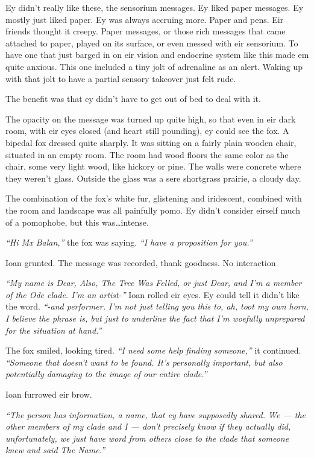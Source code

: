 Ey didn't really like these, the sensorium messages. Ey liked paper messages. Ey mostly just liked paper. Ey was always accruing more. Paper and pens. Eir friends thought it creepy. Paper messages, or those rich messages that came attached to paper, played on its surface, or even messed with eir sensorium. To have one that just barged in on eir vision and endocrine system like this made em quite anxious. This one included a tiny jolt of adrenaline as an alert. Waking up with that jolt to have a partial sensory takeover just felt rude.

The benefit was that ey didn't have to get out of bed to deal with it.

The opacity on the message was turned up quite high, so that even in eir dark room, with eir eyes closed (and heart still pounding), ey could see the fox. A bipedal fox dressed quite sharply. It was sitting on a fairly plain wooden chair, situated in an empty room. The room had wood floors the same color as the chair, some very light wood, like hickory or pine. The walls were concrete where they weren't glass. Outside the glass was a sere shortgrass prairie, a cloudy day.

The combination of the fox's white fur, glistening and iridescent, combined with the room and landscape was all painfully pomo. Ey didn't consider eirself much of a pomophobe, but this was\ldots{}intense.

\emph{``Hi Mx Balan,''} the fox was saying. \emph{``I have a proposition for you.''}

Ioan grunted. The message was recorded, thank goodness. No interaction

\emph{``My name is Dear, Also, The Tree Was Felled, or just Dear, and I'm a member of the Ode clade. I'm an artist-''} Ioan rolled eir eyes. Ey could tell it didn't like the word. \emph{``-and performer. I'm not just telling you this to, ah, toot my own horn, I believe the phrase is, but just to underline the fact that I'm woefully unprepared for the situation at hand.''}

The fox smiled, looking tired. \emph{``I need some help finding someone,''} it continued. \emph{``Someone that doesn't want to be found. It's personally important, but also potentially damaging to the image of our entire clade.''}

Ioan furrowed eir brow.

\emph{``The person has information, a name, that ey have supposedly shared. We --- the other members of my clade and I --- don't precisely know if they actually did, unfortunately, we just have word from others close to the clade that someone knew and said The Name.''}

